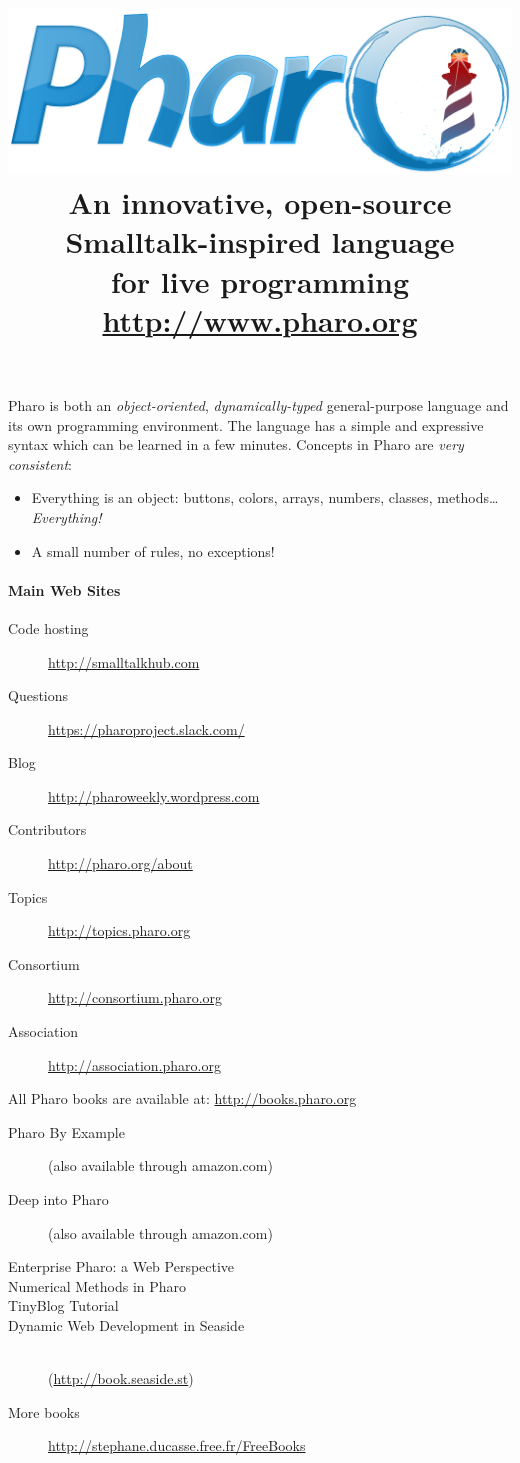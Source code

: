 \documentclass[notumble]{leaflet}
\title{
\normalfont
\includegraphics[width=0.8\linewidth]{logo.pdf}
\\[1.5\baselineskip]%
\fontseries{cl}\selectfont\large
An innovative, open-source Smalltalk-inspired language \\for live programming\\
\url{http://www.pharo.org}}
\date{}
\begin{document}
\maketitle
\thispagestyle{empty}
Pharo is both an \emph{object-oriented}, \emph{dynamically-typed}
general-purpose language and its own programming environment. The
language has a simple and expressive syntax which can be learned
in a few minutes. Concepts in Pharo are \emph{very consistent}:
\begin{itemize}
  \item Everything is an object: buttons, colors, arrays, numbers, classes, methods\ldots \emph{Everything!}
  \item A small number of rules, no exceptions!
\end{itemize}

\paragraph{Main Web Sites}
\begin{description}
 \item[Code hosting] \url{http://smalltalkhub.com}
 \item[Questions]    \url{https://pharoproject.slack.com/}
 \item[Blog] \url{http://pharoweekly.wordpress.com}
 \item[Contributors] \url{http://pharo.org/about}
 \item[Topics]       \url{http://topics.pharo.org}
 \item[Consortium]   \url{http://consortium.pharo.org}
 \item[Association]  \url{http://association.pharo.org}
\end{description}

All Pharo books are available at: \url{http://books.pharo.org}
\begin{description}
\item[Pharo By Example]
  (also available through amazon.com)
\item[Deep into Pharo]
  (also available through amazon.com)
\item [Enterprise Pharo: a Web Perspective]
\item [Numerical Methods in Pharo]
\item [TinyBlog Tutorial]
\item [Dynamic Web Development in Seaside]~\\ 
(\url{http://book.seaside.st})
\item[More books] \url{http://stephane.ducasse.free.fr/FreeBooks}
\end{description}
\end{document}
